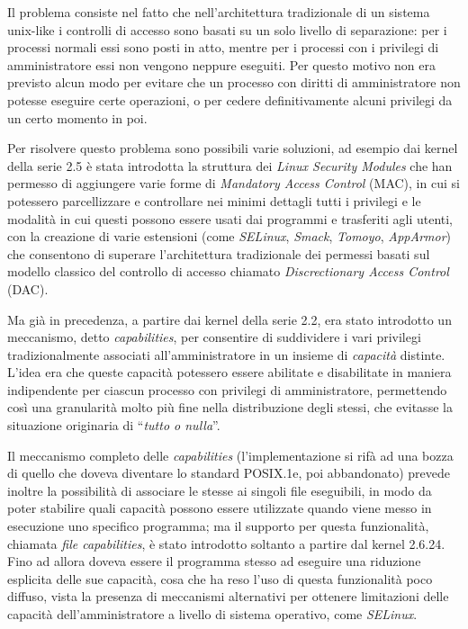 Il problema consiste nel fatto che nell'architettura tradizionale di un
sistema unix-like i controlli di accesso sono basati su un solo livello di
separazione: per i processi normali essi sono posti in atto, mentre per i
processi con i privilegi di amministratore essi non vengono neppure eseguiti.
Per questo motivo non era previsto alcun modo per evitare che un processo con
diritti di amministratore non potesse eseguire certe operazioni, o per cedere
definitivamente alcuni privilegi da un certo momento in poi. 

Per risolvere questo problema sono possibili varie soluzioni, ad esempio dai
kernel della serie 2.5 è stata introdotta la struttura dei
 \textit{Linux Security Modules} che han
permesso di aggiungere varie forme di 
\textit{Mandatory Access Control} (MAC), in cui si potessero parcellizzare e
controllare nei minimi dettagli tutti i privilegi e le modalità in cui questi
possono essere usati dai programmi e trasferiti agli utenti, con la creazione
di varie estensioni (come \textit{SELinux}, \textit{Smack}, \textit{Tomoyo},
\textit{AppArmor}) che consentono di superare l'architettura tradizionale dei
permessi basati sul modello classico del controllo di accesso chiamato
 \textit{Discrectionary Access
  Control} (DAC).

Ma già in precedenza, a partire dai kernel della serie 2.2, era stato
introdotto un meccanismo, detto \textit{capabilities}, per consentire di
suddividere i vari privilegi tradizionalmente associati all'amministratore in
un insieme di \textsl{capacità} distinte.  L'idea era che queste capacità
potessero essere abilitate e disabilitate in maniera indipendente per ciascun
processo con privilegi di amministratore, permettendo così una granularità
molto più fine nella distribuzione degli stessi, che evitasse la situazione
originaria di ``\textsl{tutto o nulla}''.


Il meccanismo completo delle \textit{capabilities} (l'implementazione si rifà
ad una bozza di quello che doveva diventare lo standard POSIX.1e, poi
abbandonato) prevede inoltre la possibilità di associare le stesse ai singoli
file eseguibili, in modo da poter stabilire quali capacità possono essere
utilizzate quando viene messo in esecuzione uno specifico programma; ma il
supporto per questa funzionalità, chiamata \textit{file capabilities}, è stato
introdotto soltanto a partire dal kernel 2.6.24. Fino ad allora doveva essere
il programma stesso ad eseguire una riduzione esplicita delle sue capacità,
cosa che ha reso l'uso di questa funzionalità poco diffuso, vista la presenza
di meccanismi alternativi per ottenere limitazioni delle capacità
dell'amministratore a livello di sistema operativo, come \textit{SELinux}.

